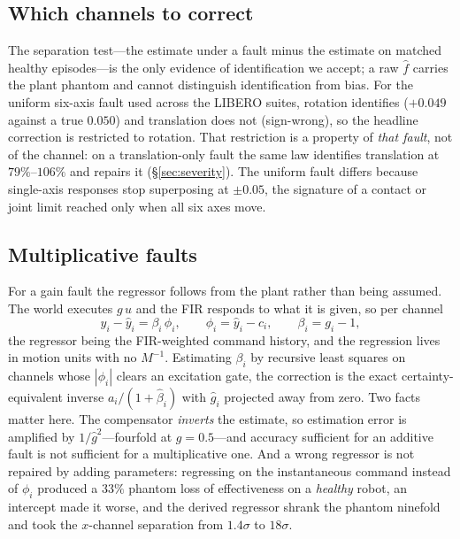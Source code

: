\documentclass{article}
\newcommand{\fhat}{\hat{f}}
\begin{document}
\subsection{Which channels to correct}
\label{sec:channels}

The separation test---the estimate under a fault minus the estimate on matched healthy
episodes---is the only evidence of identification we accept; a raw $\fhat$ carries the plant
phantom and cannot distinguish identification from bias. For the uniform six-axis fault
used across the LIBERO suites, rotation identifies ($+0.049$ against a true $0.050$) and
translation does not (sign-wrong), so the headline correction is restricted to rotation.
That restriction is a property of \emph{that fault}, not of the channel: on a translation-only
fault the same law identifies translation at $79\%$--$106\%$ and repairs it
(\S\ref{sec:severity}). The uniform fault differs because single-axis responses stop superposing at
$\pm0.05$, the signature of a contact or joint limit reached only when all six axes move.

\subsection{Multiplicative faults}
\label{sec:gain}

For a gain fault the regressor follows from the plant rather than being assumed. The world
executes $g\,u$ and the FIR responds to what it is given, so per channel
\begin{equation}
y_i - \hat y_i = \beta_i\,\phi_i,\qquad \phi_i = \hat y_i - c_i,\qquad \beta_i = g_i - 1,
\end{equation}
the regressor being the FIR-weighted command history, and the regression lives in motion
units with no $M^{-1}$. Estimating $\beta_i$ by recursive least squares on channels whose
$|\phi_i|$ clears an excitation gate, the correction is the exact certainty-equivalent
inverse $a_i/(1+\hat\beta_i)$ with $\hat g_i$ projected away from zero. Two facts matter
here. The compensator \emph{inverts} the estimate, so estimation error is amplified by
$1/\hat g^2$---fourfold at $g=0.5$---and accuracy sufficient for an additive fault is not
sufficient for a multiplicative one. And a wrong regressor is not repaired by adding
parameters: regressing on the instantaneous command instead of $\phi_i$ produced a $33\%$
phantom loss of effectiveness on a \emph{healthy} robot, an intercept made it worse, and the
derived regressor shrank the phantom ninefold and took the $x$-channel separation from
$1.4\sigma$ to $18\sigma$.
\end{document}

